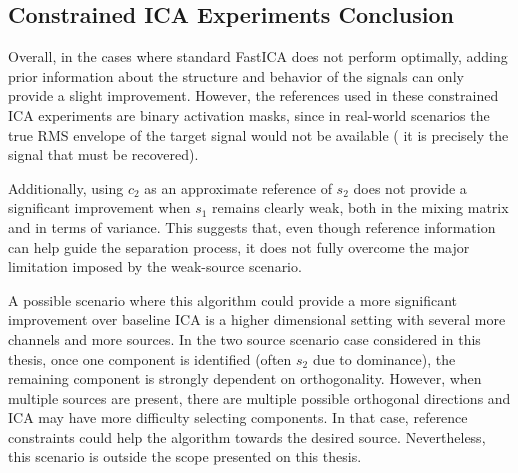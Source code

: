 \subsection{Constrained ICA Experiments Conclusion}

Overall, in the cases where standard FastICA does not perform optimally, adding prior information about the structure and behavior of the signals can only provide a slight improvement. However, the references used in these constrained ICA experiments are binary activation masks, since in real-world scenarios the true RMS envelope of the target signal would not be available ( it is precisely the signal that must be recovered). 

Additionally, using $c_2$ as an approximate reference of $s_2$ does not provide a significant improvement when $s_1$ remains clearly weak, both in the mixing matrix and in terms of variance. This suggests that, even though reference information can help guide the separation process, it does not fully overcome the major limitation imposed by the weak-source scenario.

A possible scenario where this algorithm could provide a more significant improvement over baseline ICA is a higher dimensional setting with several more channels and more sources. In the two source scenario case considered in this thesis, once one component is identified (often $s_2$ due to dominance), the remaining component is strongly dependent on orthogonality. However, when multiple sources are present, there are multiple possible orthogonal directions and ICA may have more difficulty selecting components. In that case, reference  constraints could help the algorithm towards the desired source. Nevertheless, this scenario is outside the scope presented on this thesis.